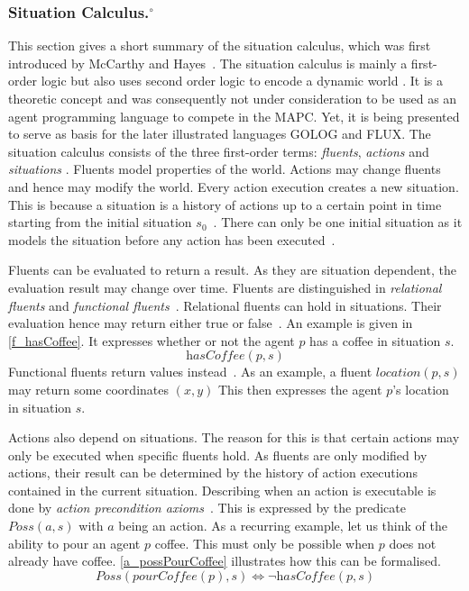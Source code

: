 \subsubsection[Situation Calculus.]{Situation Calculus.$^\circ$}\label{fun:apl_sitCalc}
This section gives a short summary of the situation calculus, which was first introduced by McCarthy and Hayes~\cite{mccarthy_philosophical_1969}. The situation calculus is mainly a first-order logic but also uses second order logic to encode a dynamic world \cite{levesque_golog:_1997}. %
It is a theoretic concept and was consequently not under consideration to be used as an agent programming language to compete in the MAPC. Yet, it is being presented to serve as basis for the later illustrated languages GOLOG and FLUX.
The situation calculus consists of the three first-order terms: \emph{fluents}, \emph{actions} and \emph{situations} \cite{mccarthy_philosophical_1969,boutilier_decision_2000}. %
Fluents model properties of the world. Actions may change fluents and hence may modify the world. Every action execution creates a new situation. This is because a situation is a history of actions up to a certain point in time starting from the initial situation $s_0$~\cite{schiffel_reconciling_2006,levesque_golog:_1997}. %
There can only be one initial situation as it models the situation before any action has been executed~\cite{pirri_contributions_1999}. %

Fluents can be evaluated to return a result. As they are situation dependent, the evaluation result may change over time. Fluents are distinguished in \emph{relational fluents} and \emph{functional fluents}~\cite{levesque_golog:_1997}. %
Relational fluents can hold in situations. Their evaluation hence may return either true or false~\cite{boutilier_decision_2000}. %
An example is given in \autoref{f_hasCoffee}. It expresses whether or not the agent $p$ has a coffee in situation $s$.
\begin{equation}\label{f_hasCoffee}
  \textit{hasCoffee}(p,s)
\end{equation}
Functional fluents return values instead~\cite{levesque_golog:_1997}. %
As an example, a fluent $\textit{location}(p,s)$ may return some coordinates $(x,y)$ This then expresses the agent $p$'s location in situation $s$.

Actions also depend on situations. The reason for this is that certain actions may only be executed when specific fluents hold. As fluents are only modified by actions, their result can be determined by the history of action executions contained in the current situation. Describing when an action is executable is done by \emph{action precondition axioms}~\cite{lin_state_1994}. %
This is expressed by the predicate $\textit{Poss}(a,s)$ with $a$ being an action. As a recurring example, let us think of the ability to pour an agent $p$ coffee. This must only be possible when $p$ does not already have coffee. \autoref{a_possPourCoffee} illustrates how this can be formalised.
\begin{equation}\label{a_possPourCoffee}
  \textit{Poss}(\textit{pourCoffee}(p),s) \Leftrightarrow \neg \textit{hasCoffee}(p,s)
\end{equation}

